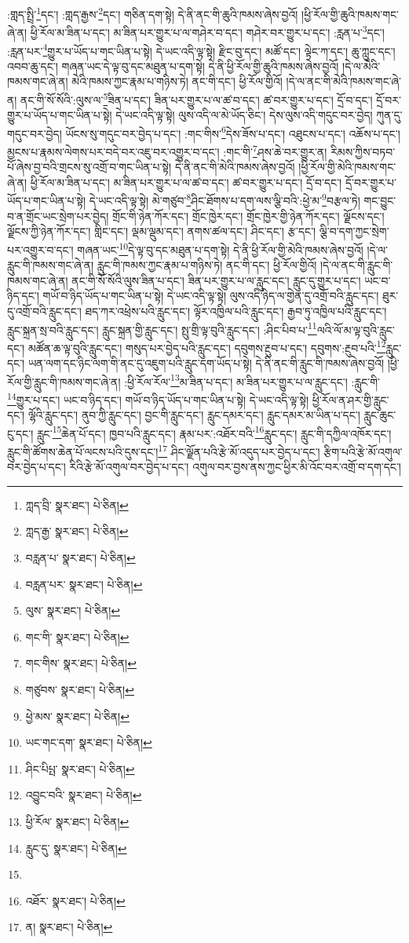 :གླད་སྤྲི་\footnote{ཀླད་བྲི་  སྣར་ཐང་།  པེ་ཅིན། }དང་། :གླད་རྒྱས་\footnote{ཀླད་རྒྱ་  སྣར་ཐང་།  པེ་ཅིན། }དང་། གཅིན་དག་སྟེ། དེ་ནི་ནང་གི་ཆུའི་ཁམས་ཞེས་བྱའོ། །ཕྱི་རོལ་གྱི་ཆུའི་ཁམས་གང་ཞེ་ན། ཕྱི་རོལ་མ་ཟིན་པ་དང་། མ་ཟིན་པར་གྱུར་པ་ལ་གཤེར་བ་དང་། གཤེར་བར་གྱུར་པ་དང་། :རླན་པ་\footnote{བརླན་པ་  སྣར་ཐང་།  པེ་ཅིན། }དང་། :རླན་པར་\footnote{བརླན་པར་  སྣར་ཐང་།  པེ་ཅིན། }གྱུར་པ་ཡོད་པ་གང་ཡིན་པ་སྟེ། དེ་ཡང་འདི་ལྟ་སྟེ། རྫིང་བུ་དང་། མཚོ་དང་། ལྟེང་ཀ་དང་། ཆུ་ཀླུང་དང་། འབབ་ཆུ་དང་། གཞན་ཡང་དེ་ལྟ་བུ་དང་མཐུན་པ་དག་སྟེ། དེ་ནི་ཕྱི་རོལ་གྱི་ཆུའི་ཁམས་ཞེས་བྱའོ། །དེ་ལ་མེའི་ཁམས་གང་ཞེ་ན། མེའི་ཁམས་ཀྱང་རྣམ་པ་གཉིས་ཏེ། ནང་གི་དང་། ཕྱི་རོལ་གྱིའོ། །དེ་ལ་ནང་གི་མེའི་ཁམས་གང་ཞེ་ན། ནང་གི་སོ་སོའི་:ལུས་ལ་\footnote{ལུས་  སྣར་ཐང་།  པེ་ཅིན། }ཟིན་པ་དང་། ཟིན་པར་གྱུར་པ་ལ་ཚ་བ་དང་། ཚ་བར་གྱུར་པ་དང་། དྲོ་བ་དང་། དྲོ་བར་གྱུར་པ་ཡོད་པ་གང་ཡིན་པ་སྟེ། དེ་ཡང་འདི་ལྟ་སྟེ། ལུས་འདི་ལ་མེ་ཡོད་ཅིང་། དེས་ལུས་འདི་གདུང་བར་བྱེད། ཀུན་དུ་གདུང་བར་བྱེད། ཡོངས་སུ་གདུང་བར་བྱེད་པ་དང་། :གང་གིས་\footnote{གང་གི་  སྣར་ཐང་།  པེ་ཅིན། }དེས་ཟོས་པ་དང་། འཐུངས་པ་དང་། འཆོས་པ་དང་། མྱངས་པ་རྣམས་ལེགས་པར་བདེ་བར་འཇུ་བར་འགྱུར་བ་དང་། :གང་གི་\footnote{གང་གིས་  སྣར་ཐང་།  པེ་ཅིན། }ཤས་ཆེ་བར་གྱུར་ན། རིམས་ཀྱིས་བཏབ་པོ་ཞེས་བྱ་བའི་གྲངས་སུ་འགྲོ་བ་གང་ཡིན་པ་སྟེ། དེ་ནི་ནང་གི་མེའི་ཁམས་ཞེས་བྱའོ། །ཕྱི་རོལ་གྱི་མེའི་ཁམས་གང་ཞེ་ན། ཕྱི་རོལ་མ་ཟིན་པ་དང་། མ་ཟིན་པར་གྱུར་པ་ལ་ཚ་བ་དང་། ཚ་བར་གྱུར་པ་དང་། དྲོ་བ་དང་། དྲོ་བར་གྱུར་པ་ཡོད་པ་གང་ཡིན་པ་སྟེ། དེ་ཡང་འདི་ལྟ་སྟེ། མེ་གཙུབ་\footnote{གཙུབས་  སྣར་ཐང་།  པེ་ཅིན། }ཤིང་ཐོགས་པ་དག་ལས་ལྕི་བའི་:ཕྱེ་མ་\footnote{ཕྱེ་མས་  སྣར་ཐང་།  པེ་ཅིན། }བརྩལ་ཏེ། གང་བྱུང་བ་ན་གྲོང་ཡང་སྲེག་པར་བྱེད། གྲོང་གི་ཉེན་ཀོར་དང་། གྲོང་ཁྱེར་དང་། གྲོང་ཁྱེར་གྱི་ཉེན་ཀོར་དང་། ལྗོངས་དང་། ལྗོངས་ཀྱི་ཉེན་ཀོར་དང་། གླིང་དང་། ལྡམ་ལྡུམ་དང་། ནགས་ཚལ་དང་། ཤིང་དང་། རྩ་དང་། ལྕི་བ་དག་ཀྱང་སྲེག་པར་འགྱུར་བ་དང་། གཞན་ཡང་\footnote{ཡང་གང་དག་  སྣར་ཐང་།  པེ་ཅིན། }དེ་ལྟ་བུ་དང་མཐུན་པ་དག་སྟེ། དེ་ནི་ཕྱི་རོལ་གྱི་མེའི་ཁམས་ཞེས་བྱའོ། །དེ་ལ་རླུང་གི་ཁམས་གང་ཞེ་ན། རླུང་གི་ཁམས་ཀྱང་རྣམ་པ་གཉིས་ཏེ། ནང་གི་དང་། ཕྱི་རོལ་གྱིའོ། །དེ་ལ་ནང་གི་རླུང་གི་ཁམས་གང་ཞེ་ན། ནང་གི་སོ་སོའི་ལུས་ཟིན་པ་དང་། ཟིན་པར་གྱུར་པ་ལ་རླུང་དང་། རླུང་དུ་གྱུར་པ་དང་། ཡང་བ་ཉིད་དང་། གཡོ་བ་ཉིད་ཡོད་པ་གང་ཡིན་པ་སྟེ། དེ་ཡང་འདི་ལྟ་སྟེ། ལུས་འདི་ཉིད་ལ་གྱེན་དུ་འགྲོ་བའི་རླུང་དང་། ཐུར་དུ་འགྲོ་བའི་རླུང་དང་། ཐད་ཀར་འཕྲེས་པའི་རླུང་དང་། ལྟོར་འཁྱིལ་པའི་རླུང་དང་། རྒྱབ་ཏུ་འཁྱིལ་པའི་རླུང་དང་། རླུང་སྐྲན་སྲ་བའི་རླུང་དང་། རླུང་སྐྲན་གྱི་རླུང་དང་། སྤུ་གྲི་ལྟ་བུའི་རླུང་དང་། :ཤིང་པིབ་པ་\footnote{ཤིང་པིཔྤ་  སྣར་ཐང་།  པེ་ཅིན། }ལའི་ལོ་མ་ལྟ་བུའི་རླུང་དང་། མཚོན་ཆ་ལྟ་བུའི་རླུང་དང་། གསུད་པར་བྱེད་པའི་རླུང་དང་། དབུགས་རྔུབ་པ་དང་། དབུགས་:རྔུབ་པའི་\footnote{འབྱུང་བའི་  སྣར་ཐང་།  པེ་ཅིན། }རླུང་དང་། ཡན་ལག་དང་ཉིང་ལག་གི་ནང་དུ་འཇུག་པའི་རླུང་དག་ཡོད་པ་སྟེ། དེ་ནི་ནང་གི་རླུང་གི་ཁམས་ཞེས་བྱའོ། །ཕྱི་རོལ་གྱི་རླུང་གི་ཁམས་གང་ཞེ་ན། :ཕྱི་རོལ་རོལ་\footnote{ཕྱི་རོལ་  སྣར་ཐང་།  པེ་ཅིན། }མ་ཟིན་པ་དང་། མ་ཟིན་པར་གྱུར་པ་ལ་རླུང་དང་། :རླུང་གི་\footnote{རླུང་དུ་  སྣར་ཐང་།  པེ་ཅིན། }གྱུར་པ་དང་། ཡང་བ་ཉིད་དང་། གཡོ་བ་ཉིད་ཡོད་པ་གང་ཡིན་པ་སྟེ། དེ་ཡང་འདི་ལྟ་སྟེ། ཕྱི་རོལ་ན་ཤར་གྱི་རླུང་དང་། ལྷོའི་རླུང་དང་། ནུབ་ཀྱི་རླུང་དང་། བྱང་གི་རླུང་དང་། རླུང་དམར་དང་། རླུང་དམར་མ་ཡིན་པ་དང་། རླུང་ཆུང་ངུ་དང་། རླུང་\footnote{}ཆེན་པོ་དང་། ཁྱབ་པའི་རླུང་དང་། རྣམ་པར་:འཐོར་བའི་\footnote{འཐོར་  སྣར་ཐང་།  པེ་ཅིན། }རླུང་དང་། རླུང་གི་དཀྱིལ་འཁོར་དང་། རླུང་གི་ཚོགས་ཆེན་པོ་ལངས་པའི་དུས་དང་།\footnote{ན།  སྣར་ཐང་།  པེ་ཅིན། } ཤིང་ལྗོན་པའི་རྩེ་མོ་འདུད་པར་བྱེད་པ་དང་། རྩིག་པའི་རྩེ་མོ་འགུལ་བར་བྱེད་པ་དང་། རིའི་རྩེ་མོ་འགུལ་བར་བྱེད་པ་དང་། འགུལ་བར་བྱས་ནས་ཀྱང་ཕྱིར་མི་འོང་བར་འགྲོ་བ་དག་དང་། 